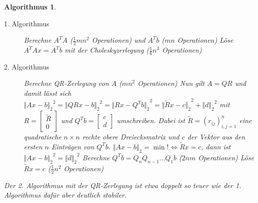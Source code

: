 \documentclass[12pt]{article}
\theoremstyle{break}
\newtheorem{algorithm}[theorem]{Algorithmus}
\begin{document}
\begin{algorithm}\leavevmode
\begin{description}
  \item[1. Algorithmus] \leavevmode 
    \begin{algorithmic}
    \STATE Berechne $A^TA$ ($\frac{1}{2}mn^2$ Operationen)
    \STATE und $A^Tb$ ($mn$ Operationen)
    \STATE Löse $A^TAx = A^Tb$ mit der Choleskyzerlegung ($\frac{1}{6} n^3$ Operationen)
    \end{algorithmic}
    
  \item[2. Algorithmus] \leavevmode
    \begin{algorithmic}
    \STATE Berechne QR-Zerlegung von $A$ ($mn^2$ Operationen)
    \STATE Nun gilt $A = QR$ und damit lässt sich ${\Vert Ax-b \Vert_2}^2 = {\Vert QRx-b \Vert_2}^2 = {\Vert Rx - Q^Tb \Vert_2}^2 = {\Vert \tilde{R}x - c \Vert_2}^2 + {\Vert d \Vert_2}^2$ mit $R = \left[ \begin{matrix} \tilde{R} \\ 0 \end{matrix} \right]$ und $Q^Tb = \left[ \begin{matrix} c \\ d \end{matrix} \right]$ umschreiben.
    \STATE Dabei ist $\tilde{R} = (r_{ij})_{i,j=1}^n$ eine quadratische $n\times n$ rechte obere Dreiecksmatrix und $c$ der Vektor aus den ersten $n$ Einträgen von $Q^Tb$.
    \STATE $\Vert Ax-b \Vert_2 = \min! \Leftrightarrow \tilde{R}x = c$, dann ist ${\Vert Ax-b \Vert_2}^2 = {\Vert d \Vert_2}^2$
    \STATE Berechne $Q^Tb = Q_n Q_{n-1}...Q_1b$ ($2nm$ Operationen)
    \STATE Löse $\tilde{R}x = c$ ($\frac{1}{2}n^2$ Operationen)
    \end{algorithmic}
\end{description}
Der 2. Algorithmus mit der QR-Zerlegung ist etwa doppelt so teuer wie der 1. Algorithmus dafür aber deutlich stabiler.
\end{algorithm}
\end{document}
